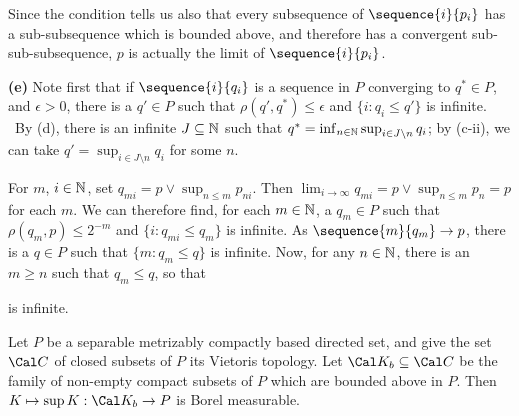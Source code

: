 {Since the condition tells us also that every subsequence of
$\sequence{i}{p_i}$ has a sub-subsequence which is bounded above, and
therefore has a convergent sub-sub-subsequence, $p$ is
actually the limit of $\sequence{i}{p_i}$.

\medskip

{\bf (e)} Note first that if $\sequence{i}{q_i}$ is a sequence in $P$
converging to $q^*\in P$, and $\epsilon>0$, there is a $q'\in P$ such
that $\rho(q',q^*)\le\epsilon$ and $\{i:q_i\le q'\}$ is infinite.
\Prf\  By (d), there is an infinite $J\subseteq\Bbb N$ such that
$q^*=\inf_{n\in\Bbb N}\sup_{i\in J\setminus n}q_i$;  by (c-ii), we can
take $q'=\sup_{i\in J\setminus n}q_i$ for some $n$.\ \Qed

For $m$, $i\in\Bbb N$, set $q_{mi}=p\vee\sup_{n\le m}p_{ni}$.
Then $\lim_{i\to\infty}q_{mi}=p\vee\sup_{n\le m}p_n=p$ for each
$m$.   We can therefore find, for each $m\in\Bbb N$, a $q_m\in P$ such
that $\rho(q_m,p)\le 2^{-m}$ and $\{i:q_{mi}\le q_m\}$ is infinite.   As
$\sequence{m}{q_m}\to p$, there is a
$q\in P$ such that $\{m:q_m\le q\}$ is infinite.   Now, for any
$n\in\Bbb N$, there is an $m\ge n$ such that $q_m\le q$, so that


\noindent is infinite.
}%

 Let $P$ be a separable
metrizably compactly based directed set, and give the set
$\Cal C$ of closed subsets of $P$ its Vietoris topology.
Let $\Cal K_b\subseteq\Cal C$ be the family of non-empty compact subsets
of $P$ which are bounded above in $P$.   Then
$K\mapsto\sup K:\Cal K_b\to P$ is Borel measurable.



